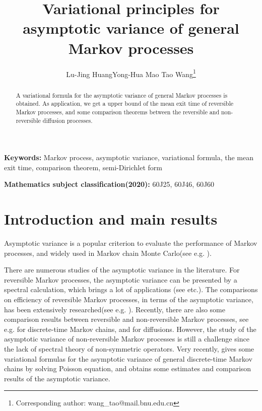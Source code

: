 \documentclass[12pt,reqno]{article}
\title{\bf  {Variational principles for asymptotic variance of general Markov processes}}
\author{Lu-Jing Huang\qquad Yong-Hua Mao \qquad Tao Wang\thanks{Corresponding author:  wang\_tao@mail.bnu.edu.cn}}
\date{}
\theoremstyle{definition}
\theoremstyle{remark}
\theoremstyle{example}
\numberwithin{equation}{section}
\def\d{\mathrm{d}}
\def\bR{\mathbb R}
\def\d{\rm d}
\def\bg{\begin}
\def\d{{\mbox{\rm d}}}
\begin{document}
 \maketitle



\bg{abstract}

A variational formula for the asymptotic variance of general Markov processes is obtained.
As application, we get a upper bound of the mean exit time of reversible Markov processes, and some comparison theorems between the reversible and non-reversible diffusion processes.


\end{abstract}

{\bf Keywords:} Markov process, asymptotic variance, variational formula, the mean exit time, comparison theorem, semi-Dirichlet form

{\bf Mathematics subject classification(2020):} 60J25, 60J46, 60J60



\section{Introduction and main results}

Asymptotic variance is a popular criterion to evaluate the performance of Markov processes, and widely used in Markov chain Monte Carlo(see e.g. \cite{AL19,CCHP12,MDO14,Pe73,RR08}).

There are numerous studies of the asymptotic variance in the literature. For reversible Markov processes, the asymptotic variance can be presented by a spectral calculation, which brings a lot of applications (see \cite{DL01,KV86,RR97} etc.).
The comparisons %
on efficiency of reversible Markov processes, in terms of the asymptotic variance, has been extensively researched(see e.g. \cite{AL19,HM21+,LM08,Pe73,Ti98}). Recently, there are also some comparison results between reversible and non-reversible Markov processes, see e.g.  \cite{Bi16,CH13,Hw05,SGS10} for discrete-time Markov chains, and \cite{DLP16,HNW15,RS15} for diffusions.
However,  the study of the asymptotic variance of non-reversible Markov processes is still a challenge since  the lack of spectral theory of non-symmetric operators.  Very recently, \cite{HM21+} gives some variational formulas for the asymptotic variance of general discrete-time Markov chains by  solving Poisson equation, and obtains some estimates and comparison results of  the asymptotic variance.
\end{document}
